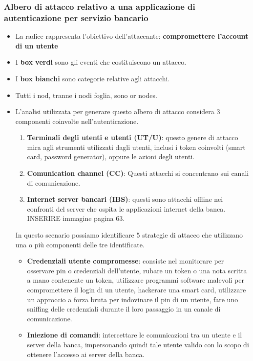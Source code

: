 \documentclass[12pt]{article}
\begin{document}
			\subsubsection{Albero di attacco relativo a una applicazione di autenticazione per servizio bancario }
				\begin{itemize}
					\item La radice rappresenta l'obiettivo dell'attaccante: \textbf{compromettere l'account di un utente}
					\item I \textbf{box verdi} sono gli eventi che costituiscono un attacco.
					\item I \textbf{box bianchi} sono categorie relative agli attacchi.
					\item Tutti i nod, tranne i nodi foglia, sono or nodes.
					\item L'analisi utilizzata per generare questo albero di attacco considera 3 componenti coinvolte nell'autenticazione.
					\begin{enumerate}
						\item \textbf{Terminali degli utenti e utenti (UT/U)}: questo genere di attacco mira agli strumenti utilizzati dagli utenti, inclusi i token coinvolti (smart card, password generator), oppure le azioni degli utenti.
						\item \textbf{Comunication channel (CC)}: Questi attacchi si concentrano sui canali di comunicazione.
						\item \textbf{Internet server bancari (IBS)}: questi sono attacchi offline nei confronti del server che ospita le applicazioni internet della banca. INSERIRE immagine pagina 63.
					\end{enumerate} 
				In questo scenario possiamo identificare 5 strategie di attacco che utilizzano una o più componenti delle tre identificate.
				\begin{itemize}
					\item \textbf{Credenziali utente compromesse}: consiste nel monitorare per osservare pin o credenziali dell'utente, rubare un token o una nota scritta a mano contenente un token, utilizzare programmi software malevoli per compromettere il login di un utente, hackerare una smart card, utilizzare un approccio a forza bruta per indovinare il pin di un utente, fare uno sniffing delle credenziali durante il loro passaggio in un canale di comunicazione.
					\item \textbf{Iniezione di comandi}: intercettare le comunicazioni tra un utente e il server della banca, impersonando quindi tale utente valido con lo scopo di ottenere l'accesso ai server della banca.

\end{itemize}
\end{itemize}
\end{document}
